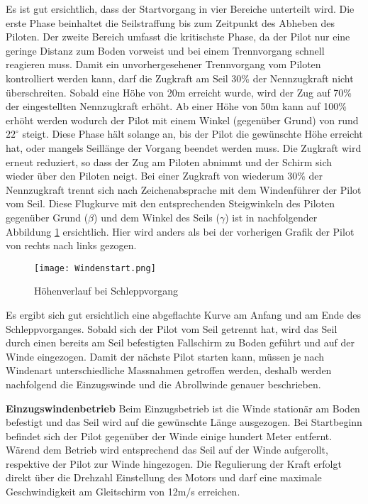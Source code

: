 Es ist gut ersichtlich, dass der Startvorgang in vier Bereiche unterteilt wird. Die erste Phase beinhaltet die Seilstraffung bis zum Zeitpunkt des Abheben des Piloten. Der zweite Bereich umfasst die kritischste Phase, da der Pilot nur eine geringe Distanz zum Boden vorweist und bei einem Trennvorgang schnell reagieren muss. Damit ein unvorhergesehener Trennvorgang vom Piloten kontrolliert werden kann, darf die Zugkraft am Seil 30\% der Nennzugkraft nicht überschreiten. Sobald eine Höhe von 20m erreicht wurde, wird der Zug auf 70\% der eingestellten Nennzugkraft erhöht. Ab einer Höhe von 50m kann auf 100\% erhöht werden wodurch der Pilot mit einem Winkel (gegenüber Grund) von rund $22^\circ$ steigt. Diese Phase hält solange an, bis der Pilot die gewünschte Höhe erreicht hat, oder mangels Seillänge der Vorgang beendet werden muss. Die Zugkraft wird erneut reduziert, so dass der Zug am Piloten abnimmt und der Schirm sich wieder über den Piloten neigt. Bei einer Zugkraft von wiederum 30\% der Nennzugkraft trennt sich nach Zeichenabsprache mit dem Windenführer der Pilot vom Seil. Diese Flugkurve mit den entsprechenden Steigwinkeln des Piloten gegenüber Grund ($\beta$) und dem Winkel des Seils ($\gamma$) ist in nachfolgender Abbildung \ref{fig:HoehenverlaufSchlepp} ersichtlich. Hier wird anders als bei der vorherigen Grafik der Pilot von rechts nach links gezogen.


\begin{figure}[H]
	\begin{center}
		\texttt{[image: Windenstart.png]}
		\caption{Höhenverlauf bei Schleppvorgang \cite{PhysikWindenschlepp}}
		\label{fig:HoehenverlaufSchlepp}
	\end{center}
\end{figure}

Es ergibt sich gut ersichtlich eine abgeflachte Kurve am Anfang und am Ende des Schleppvorganges. Sobald sich der Pilot vom Seil getrennt hat, wird das Seil durch einen bereits am Seil befestigten Fallschirm zu Boden geführt und auf der Winde eingezogen. Damit der nächste Pilot starten kann, müssen je nach Windenart unterschiedliche Massnahmen getroffen werden, deshalb werden nachfolgend die Einzugswinde und die Abrollwinde genauer beschrieben.


\textbf{Einzugswindenbetrieb}
Beim Einzugsbetrieb ist die Winde stationär am Boden befestigt und das Seil wird auf die gewünschte Länge ausgezogen. Bei Startbeginn befindet sich der Pilot gegenüber der Winde einige hundert Meter entfernt. Wärend dem Betrieb wird entsprechend das Seil auf der Winde aufgerollt, respektive der Pilot zur Winde hingezogen. Die Regulierung der Kraft erfolgt direkt über die Drehzahl Einstellung des Motors und darf eine maximale Geschwindigkeit am Gleitschirm von 12m/s erreichen.

